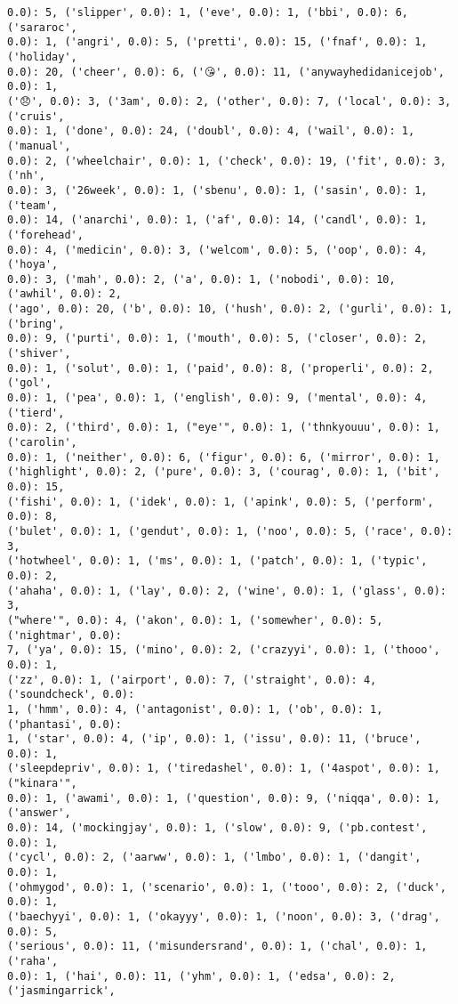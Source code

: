 \documentclass[11pt]{article}
\begin{document}
\begin{Verbatim}[commandchars=\\\{\}]
0.0): 5, ('slipper', 0.0): 1, ('eve', 0.0): 1, ('bbi', 0.0): 6, ('sararoc',
0.0): 1, ('angri', 0.0): 5, ('pretti', 0.0): 15, ('fnaf', 0.0): 1, ('holiday',
0.0): 20, ('cheer', 0.0): 6, ('😘', 0.0): 11, ('anywayhedidanicejob', 0.0): 1,
('😞', 0.0): 3, ('3am', 0.0): 2, ('other', 0.0): 7, ('local', 0.0): 3, ('cruis',
0.0): 1, ('done', 0.0): 24, ('doubl', 0.0): 4, ('wail', 0.0): 1, ('manual',
0.0): 2, ('wheelchair', 0.0): 1, ('check', 0.0): 19, ('fit', 0.0): 3, ('nh',
0.0): 3, ('26week', 0.0): 1, ('sbenu', 0.0): 1, ('sasin', 0.0): 1, ('team',
0.0): 14, ('anarchi', 0.0): 1, ('af', 0.0): 14, ('candl', 0.0): 1, ('forehead',
0.0): 4, ('medicin', 0.0): 3, ('welcom', 0.0): 5, ('oop', 0.0): 4, ('hoya',
0.0): 3, ('mah', 0.0): 2, ('a', 0.0): 1, ('nobodi', 0.0): 10, ('awhil', 0.0): 2,
('ago', 0.0): 20, ('b', 0.0): 10, ('hush', 0.0): 2, ('gurli', 0.0): 1, ('bring',
0.0): 9, ('purti', 0.0): 1, ('mouth', 0.0): 5, ('closer', 0.0): 2, ('shiver',
0.0): 1, ('solut', 0.0): 1, ('paid', 0.0): 8, ('properli', 0.0): 2, ('gol',
0.0): 1, ('pea', 0.0): 1, ('english', 0.0): 9, ('mental', 0.0): 4, ('tierd',
0.0): 2, ('third', 0.0): 1, ("eye'", 0.0): 1, ('thnkyouuu', 0.0): 1, ('carolin',
0.0): 1, ('neither', 0.0): 6, ('figur', 0.0): 6, ('mirror', 0.0): 1,
('highlight', 0.0): 2, ('pure', 0.0): 3, ('courag', 0.0): 1, ('bit', 0.0): 15,
('fishi', 0.0): 1, ('idek', 0.0): 1, ('apink', 0.0): 5, ('perform', 0.0): 8,
('bulet', 0.0): 1, ('gendut', 0.0): 1, ('noo', 0.0): 5, ('race', 0.0): 3,
('hotwheel', 0.0): 1, ('ms', 0.0): 1, ('patch', 0.0): 1, ('typic', 0.0): 2,
('ahaha', 0.0): 1, ('lay', 0.0): 2, ('wine', 0.0): 1, ('glass', 0.0): 3,
("where'", 0.0): 4, ('akon', 0.0): 1, ('somewher', 0.0): 5, ('nightmar', 0.0):
7, ('ya', 0.0): 15, ('mino', 0.0): 2, ('crazyyi', 0.0): 1, ('thooo', 0.0): 1,
('zz', 0.0): 1, ('airport', 0.0): 7, ('straight', 0.0): 4, ('soundcheck', 0.0):
1, ('hmm', 0.0): 4, ('antagonist', 0.0): 1, ('ob', 0.0): 1, ('phantasi', 0.0):
1, ('star', 0.0): 4, ('ip', 0.0): 1, ('issu', 0.0): 11, ('bruce', 0.0): 1,
('sleepdepriv', 0.0): 1, ('tiredashel', 0.0): 1, ('4aspot', 0.0): 1, ("kinara'",
0.0): 1, ('awami', 0.0): 1, ('question', 0.0): 9, ('niqqa', 0.0): 1, ('answer',
0.0): 14, ('mockingjay', 0.0): 1, ('slow', 0.0): 9, ('pb.contest', 0.0): 1,
('cycl', 0.0): 2, ('aarww', 0.0): 1, ('lmbo', 0.0): 1, ('dangit', 0.0): 1,
('ohmygod', 0.0): 1, ('scenario', 0.0): 1, ('tooo', 0.0): 2, ('duck', 0.0): 1,
('baechyyi', 0.0): 1, ('okayyy', 0.0): 1, ('noon', 0.0): 3, ('drag', 0.0): 5,
('serious', 0.0): 11, ('misundersrand', 0.0): 1, ('chal', 0.0): 1, ('raha',
0.0): 1, ('hai', 0.0): 11, ('yhm', 0.0): 1, ('edsa', 0.0): 2, ('jasmingarrick',

\end{Verbatim}
\end{document}
